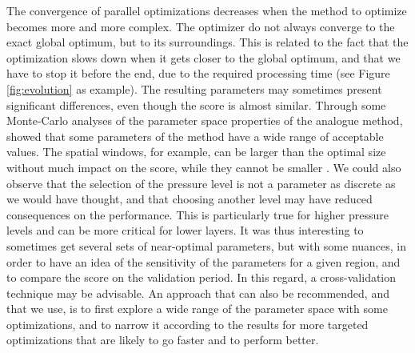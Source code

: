 \documentclass[5p]{elsarticle}
\begin{document}
The convergence of parallel optimizations decreases when the method to optimize becomes more and more complex. The optimizer do not always converge to the exact global optimum, but to its surroundings. This is related to the fact that the optimization slows down when it gets closer to the global optimum, and that we have to stop it before the end, due to the required processing time (see Figure \ref{fig:evolution} as example). The resulting parameters may sometimes present significant differences, even though the score is almost similar. Through some Monte-Carlo analyses of the parameter space properties of the analogue method, \citet{Horton2012a} showed that some parameters of the method have a wide range of acceptable values. The spatial windows, for example, can be larger than the optimal size without much impact on the score, while they cannot be smaller \citep[see also][]{Bontron2004}. We could also observe that the selection of the pressure level is not a parameter as discrete as we would have thought, and that choosing another level may have reduced consequences on the performance. This is particularly true for higher pressure levels and can be more critical for lower layers. It was thus interesting to sometimes get several sets of near-optimal parameters, but with some nuances, in order to have an idea of the sensitivity of the parameters for a given region, and to compare the score on the validation period. In this regard, a cross-validation technique may be advisable. An approach that can also be recommended, and that we use, is to first explore a wide range of the parameter space with some optimizations, and to narrow it according to the results for more targeted optimizations that are likely to go faster and to perform better.
\end{document}
